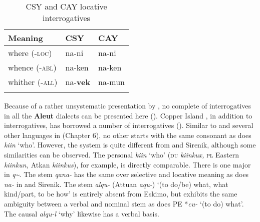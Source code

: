 \begin{table}
\caption{CSY \citep{Jacobson2001} and CAY locative interrogatives \citep{Miyaoka2012}}
\label{tab:eska:8}

\begin{tabularx}{\textwidth}{XXl}
\lsptoprule

\textbf{Meaning} & \textbf{CSY} & \textbf{CAY}\\
\midrule
where (-\textsc{loc}) & na-ni & na-ni\\
whence (-\textsc{abl}) & na-ken & na-ken\\
whither (-\textsc{all}) & na-\textbf{vek} & na-mun\\
\lspbottomrule
\end{tabularx}
\end{table}

Because of a rather unsystematic presentation by \citet[80-83]{Bergsland1997}, no complete  of interrogatives in all the \textbf{Aleut} dialects can be presented here (). Copper Island , in addition to  interrogatives, has borrowed a number of  interrogatives (). Similar to  and several other languages in  (Chapter 6), no other  starts with the same consonant as does \textit{kiin} ‘who’. However, the  system is quite different from  and Sirenik, although some similarities can be observed. The personal  \textit{kiin} ‘who’ (\textsc{du} \textit{kiinkux,} \textsc{pl} Eastern \textit{kiinkun,} Atkan \textit{kiinkus}), for example, is directly comparable. There is one major  in \textit{q{\textasciitilde}}. The stem \textit{qana-} has the same  over selective and locative meaning as does \textit{na-} in  and Sirenik. The stem \textit{alqu-} (Attuan \textit{aqu-}) ‘(to do/be) what, what kind/part, to be how’ is entirely absent from Eskimo, but exhibits the same ambiguity between a verbal and nominal stem as does PE *\textit{cu-} ‘(to do) what’. The causal  \textit{alqu-l} ‘why’ likewise has a verbal basis.

